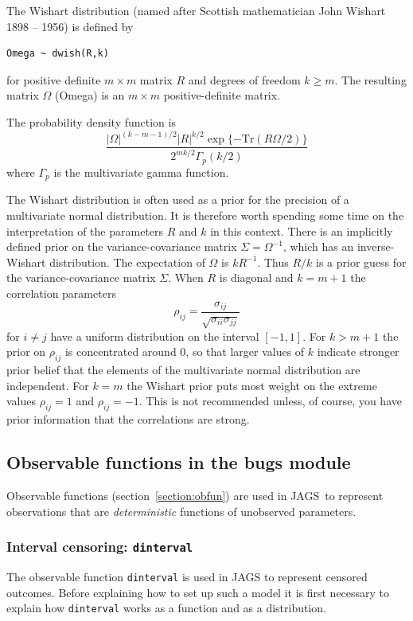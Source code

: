 \documentclass[11pt, a4paper, titlepage]{report}
\newcommand{\JAGS}{\textsf{JAGS}}
\begin{document}
{The Wishart distribution (named after Scottish mathematician John
Wishart 1898 -- 1956) is defined by
\begin{verbatim}
Omega ~ dwish(R,k)
\end{verbatim}
for positive definite $m \times m$ matrix $R$ and degrees of freedom
$k \geq m$. The resulting matrix $\Omega$ (Omega) is an $m \times m$
positive-definite matrix.

The probability density function is
\[
\frac{\textstyle |\Omega|^{(k-m-1)/2} |R|^{k/2}
  \exp\{-\text{Tr}(R\Omega/2)\}} {\textstyle 2^{mk/2} \Gamma_p
  (k/2)}
\]
where $\Gamma_p$ is the multivariate gamma function.

The Wishart distribution is often used as a prior for the precision of
a multivariate normal distribution. It is therefore worth spending
some time on the interpretation of the parameters $R$ and $k$ in this
context. There is an implicitly defined prior on the
variance-covariance matrix $\Sigma = \Omega^{-1}$, which has an
inverse-Wishart distribution. The expectation of $\Omega$ is
$kR^{-1}$. Thus $R/k$ is a prior guess for the variance-covariance
matrix $\Sigma$. When $R$ is diagonal and $k=m+1$ the correlation
parameters
\[
\rho_{ij} = \frac{\sigma_{ij}}{\sqrt{\sigma_{ii} \sigma_{jj}}}
\]
for $i \neq j$ have a uniform distribution on the interval
$[-1,1]$. For $k > m+1$ the prior on $\rho_{ij}$ is concentrated
around $0$, so that larger values of $k$ indicate stronger prior
belief that the elements of the multivariate normal distribution are
independent. For $k=m$ the Wishart prior puts most weight on the
extreme values $\rho_{ij} = 1$ and $\rho_{ij} = -1$. This is not
recommended unless, of course, you have prior information that the
correlations are strong.

\subsection{Observable functions in the bugs module}
\label{section:bugs:obfun}

Observable functions (section~\ref{section:obfun}) are used in
\JAGS\ to represent observations that are {\em deterministic}
functions of unobserved parameters.

\subsubsection{Interval censoring: \texttt{dinterval}}
\label{bugs:dinterval}

The observable function \texttt{dinterval} is used in JAGS to
represent censored outcomes. Before explaining how to set up such a
model it is first necessary to explain how \texttt{dinterval} works as
a function and as a distribution.

}
\end{document}
